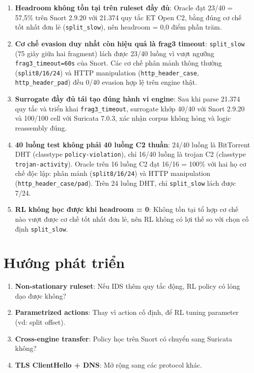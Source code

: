 \documentclass[12pt, a4paper, openany]{book}
\begin{document}
\begin{enumerate}
    \item \textbf{Headroom không tồn tại trên ruleset đầy đủ}: Oracle đạt 23/40 = 57,5\% trên Snort 2.9.20 với 21.374 quy tắc ET Open C2, bằng đúng cơ chế tốt nhất đơn lẻ (\texttt{split\_slow}), nên headroom = 0,0 điểm phần trăm.
    \item \textbf{Cơ chế evasion duy nhất còn hiệu quả là frag3 timeout}: \texttt{split\_slow} (75 giây giữa hai fragment) lách được 23/40 luồng vì vượt ngưỡng \texttt{frag3\_timeout=60s} của Snort. Các cơ chế phân mảnh thông thường (\texttt{split8/16/24}) và HTTP manipulation (\texttt{http\_header\_case}, \texttt{http\_header\_pad}) đều 0/40 evasion hợp lệ trên engine thật.
    \item \textbf{Surrogate đầy đủ tái tạo đúng hành vi engine}: Sau khi parse 21.374 quy tắc và triển khai \texttt{frag3\_timeout}, surrogate khớp 40/40 với Snort 2.9.20 và 100/100 cell với Suricata 7.0.3, xác nhận corpus không hỏng và logic reassembly đúng.
    \item \textbf{40 luồng test không phải 40 luồng C2 thuần}: 24/40 luồng là BitTorrent DHT (classtype \texttt{policy-violation}), chỉ 16/40 luồng là trojan C2 (classtype \texttt{trojan-activity}). Oracle trên 16 luồng C2 đạt 16/16 = 100\% với hai họ cơ chế độc lập: phân mảnh (\texttt{split8/16/24}) và HTTP manipulation (\texttt{http\_header\_case/pad}). Trên 24 luồng DHT, chỉ \texttt{split\_slow} lách được 7/24.
    \item \textbf{RL không học được khi headroom = 0}: Không tồn tại tổ hợp cơ chế nào vượt được cơ chế tốt nhất đơn lẻ, nên RL không có lợi thế so với chọn cố định \texttt{split\_slow}.
\end{enumerate}

\section{Hướng phát triển}

\begin{enumerate}
    \item \textbf{Non-stationary ruleset}: Nếu IDS thêm quy tắc động, RL policy có lỏng dạo được không?
    \item \textbf{Parametrized actions}: Thay vì action cố định, để RL tuning parameter (vd: split offset).
    \item \textbf{Cross-engine transfer}: Policy học trên Snort có chuyển sang Suricata không?
    \item \textbf{TLS ClientHello + DNS}: Mở rộng sang các protocol khác.
\end{enumerate}
\end{document}
